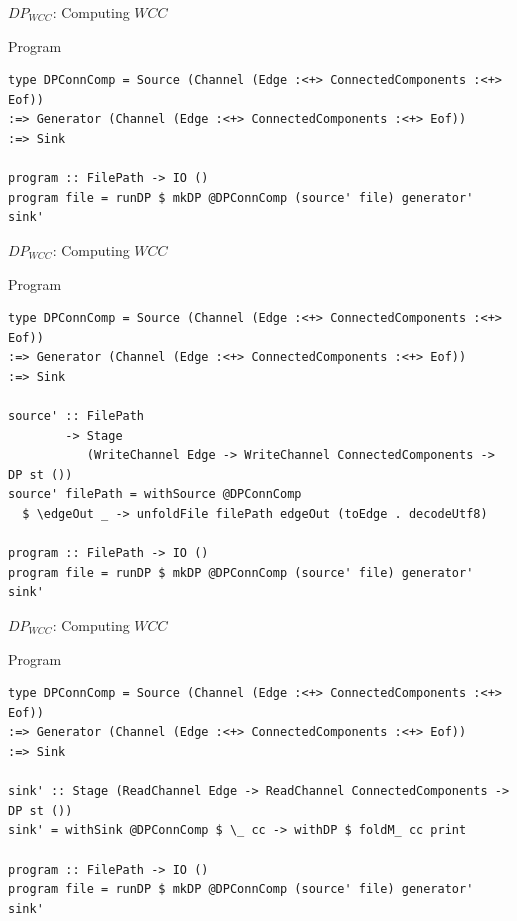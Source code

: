 \documentclass{beamer}
\begin{document}
  \begin{frame}[fragile]{$DP_{WCC}$: Computing $WCC$}
    \begin{block}{Program}
      \begin{verbatim}      
type DPConnComp = Source (Channel (Edge :<+> ConnectedComponents :<+> Eof))
:=> Generator (Channel (Edge :<+> ConnectedComponents :<+> Eof))
:=> Sink

program :: FilePath -> IO ()
program file = runDP $ mkDP @DPConnComp (source' file) generator' sink'
      \end{verbatim}
    \end{block}
  \end{frame}


  \begin{frame}[fragile]{$DP_{WCC}$: Computing $WCC$}
    \begin{block}{Program}
      \begin{verbatim}      
type DPConnComp = Source (Channel (Edge :<+> ConnectedComponents :<+> Eof))
:=> Generator (Channel (Edge :<+> ConnectedComponents :<+> Eof))
:=> Sink

source' :: FilePath
        -> Stage
           (WriteChannel Edge -> WriteChannel ConnectedComponents -> DP st ())
source' filePath = withSource @DPConnComp
  $ \edgeOut _ -> unfoldFile filePath edgeOut (toEdge . decodeUtf8)

program :: FilePath -> IO ()
program file = runDP $ mkDP @DPConnComp (source' file) generator' sink'  
      \end{verbatim}
    \end{block}
  \end{frame}

  \begin{frame}[fragile]{$DP_{WCC}$: Computing $WCC$}
    \begin{block}{Program}
      \begin{verbatim}      
type DPConnComp = Source (Channel (Edge :<+> ConnectedComponents :<+> Eof))
:=> Generator (Channel (Edge :<+> ConnectedComponents :<+> Eof))
:=> Sink

sink' :: Stage (ReadChannel Edge -> ReadChannel ConnectedComponents -> DP st ())
sink' = withSink @DPConnComp $ \_ cc -> withDP $ foldM_ cc print

program :: FilePath -> IO ()
program file = runDP $ mkDP @DPConnComp (source' file) generator' sink'  
      \end{verbatim}
    \end{block}
  \end{frame}
\end{document}

